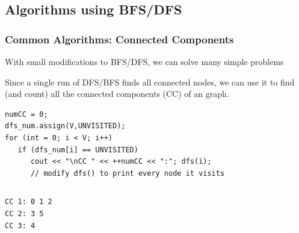 \documentclass{beamer}
\begin{document}
\subsection{Algorithms using BFS/DFS}
\begin{frame}
  \frametitle{Common Algorithms: Connected Components}
  {\smaller
    \begin{block}{}
      With small modifications to BFS/DFS, we can solve many simple problems
    \end{block}

    Since a single run of DFS/BFS finds all connected nodes, we can
    use it to find (and count) all the connected components (CC) of an
     graph.

    \begin{exampleblock}{}
\begin{verbatim}
numCC = 0;
dfs_num.assign(V,UNVISITED);
for (int = 0; i < V; i++)
   if (dfs_num[i] == UNVISITED)
      cout << "\nCC " << ++numCC << ":"; dfs(i);
      // modify dfs() to print every node it visits
\end{verbatim}
    \end{exampleblock}}

\begin{columns}
  \hfill
\begin{verbatim}
CC 1: 0 1 2
CC 2: 3 5
CC 3: 4
\end{verbatim}
\end{columns}
\end{frame}
\end{document}

